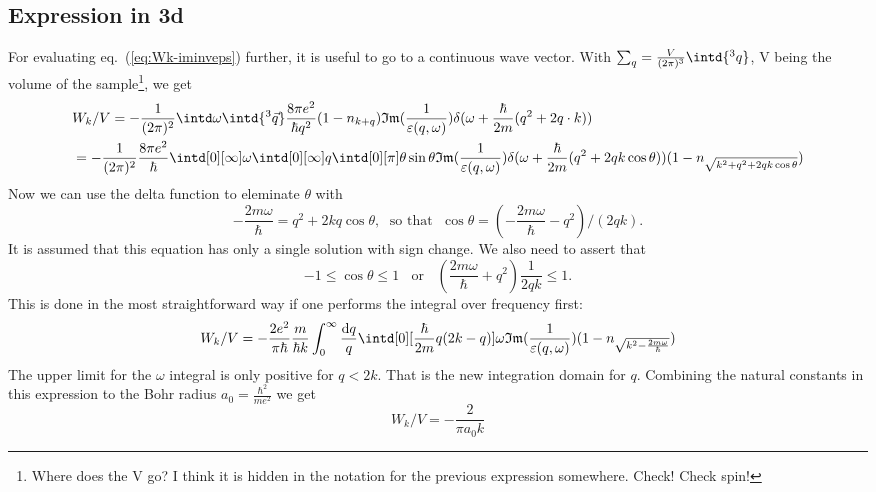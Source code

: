 \documentclass[physics,phd,nolot,nolof]{uccthesis}%
\begin{document}
{\subsection{Expression in 3d}
For evaluating eq.~(\ref{eq:Wk-iminveps}) further, it is useful to go to a 
continuous wave vector. 
With $\sum_q = \frac{V}{(2\pi)^3}\intd{^3 q}$, V being the volume of the 
sample\footnote{Where does the V go? I think it is hidden in the 
notation for the previous expression somewhere. Check! Check spin!}, 
we get 
\begin{equation}
  \begin{split}
    &  W_k/V=-\frac{1}{(2\pi)^2}\intd\omega\intd{^3\vec q}
  \frac{8\pi e^2}{\hbar q^2}
  (1-n_{k+q})
  \mathfrak{Im}(\frac{1}{\varepsilon(q,\omega)})
  \delta( \omega + \frac{\hbar}{2 m}(q^2 + 2q\cdot k))\\
&  =-\frac{1}{(2\pi)^2} 
  \frac{8\pi e^2}{\hbar}
  \intd[0][\infty]\omega 
  \intd[0][\infty]q\intd[0][\pi]\theta\sin\theta
  \mathfrak{Im}(\frac{1}{\varepsilon(q,\omega)})
  \delta( \omega + \frac{\hbar}{2 m}(q^2 + 2qk\cos\theta))
  (1-n_{\sqrt{k^2 + q^2 +2qk\cos\theta}})
  \end{split}
  \label{eq:Wk/V}
\end{equation}
Now we can use the delta function to eleminate
$\theta$ with  
$$-\frac{2m\omega}{\hbar} = q^2 +2kq \cos\theta, 
\;\text{ so that }\;
\cos\theta = (-\frac{2m\omega}{\hbar}-q^2)/(2qk).$$
It is assumed that this equation has only a single solution with sign change.
We also need to assert that 
\begin{equation}
  -1 \leq \cos\theta \leq 1 \;\;\text{ or }\;\;
  \left(\frac{2m\omega}{\hbar} +q^2 \right)\frac{1}{2qk} \leq 1.
  \label{eq:cos_smaller_than1}
\end{equation}
This is done in the most straightforward way if one performs the integral over
frequency first:
\begin{equation}
  W_k/V = 
  - \frac{2e^2}{\pi \hbar} 
  \frac{m}{\hbar k}
  \int_0^\infty\frac{\mathrm{d}q}{q}
  \intd[0][\frac{\hbar}{2m}q(2k-q)]\omega 
  \mathfrak{Im}(\frac{1}{\varepsilon(q,\omega)})
  (1-n_{\sqrt{k^2 -\frac{2m\omega}{\hbar}}})
  \label{eq:Wk/V2}
\end{equation}
The upper limit for the $\omega$ integral is only positive for 
$q < 2k$. That is the new integration domain for $q$.
Combining the natural constants in this expression to the Bohr radius
$a_0 = \frac{\hbar^2}{m e^2}$
we get 
\begin{equation}
  W_k/V = 
  - \frac{2}{\pi a_0 k} 

\end{equation}}
\end{document}
